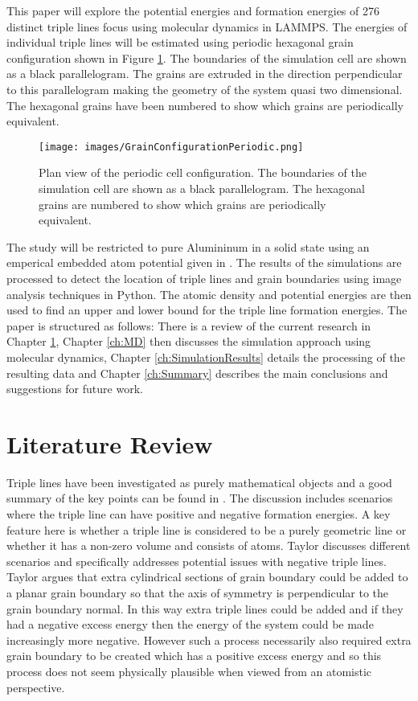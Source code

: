 \documentclass[12pt,a4paper,openany]{report}
\begin{document}
This paper will explore the potential energies and formation energies of 276 distinct triple lines focus using molecular dynamics in LAMMPS. The energies of individual triple lines will be estimated using periodic hexagonal grain configuration shown in Figure \ref{fig:PerCell}. The boundaries of the simulation cell are shown as a black parallelogram. The grains are extruded in the direction perpendicular to this parallelogram making the geometry of the system quasi two dimensional. The hexagonal grains have been numbered to show which grains are periodically equivalent.

\begin{figure}[H]
	\texttt{[image: images/GrainConfigurationPeriodic.png]}
	\label{fig:PerCell} 
	\caption{Plan view of the periodic cell configuration. The boundaries of the simulation cell are shown as a black parallelogram. The hexagonal grains are numbered to show which grains are periodically equivalent.}
\end{figure}

The study will be restricted to pure Alumininum in a solid state using an emperical embedded atom potential given in \cite{Zope2003}. The results of the simulations are processed to detect the location of triple lines and grain boundaries using image analysis techniques in Python. The atomic density and potential energies are then used to find an upper and lower bound for the triple line formation energies. The paper is structured as follows: There is a review of the current research in Chapter \ref{ch:lr}, Chapter \ref{ch:MD} then discusses the simulation approach using molecular dynamics, Chapter \ref{ch:SimulationResults} details the processing of the resulting data and Chapter \ref{ch:Summary} describes the main conclusions and suggestions for future work.   


\chapter{Literature Review} \label{ch:lr}

 
Triple lines have been investigated as purely mathematical objects and a good summary of the key points can be found in \cite{Taylor1999}. The discussion includes scenarios where the triple line can have positive and negative formation energies. A key feature here is whether a triple line is considered to be a purely geometric line or whether it has a non-zero volume and consists of atoms. Taylor discusses different scenarios and specifically addresses potential issues with negative triple lines. Taylor argues that extra cylindrical sections of grain boundary could be added to a planar grain boundary so that the axis of symmetry is perpendicular to the grain boundary normal. In this way extra triple lines could be added and if they had a negative excess energy then the energy of the system could be made increasingly more negative. However such a process necessarily also required extra grain boundary to be created which has a positive excess energy and so this process does not seem physically plausible when viewed from an atomistic perspective.
\end{document}
